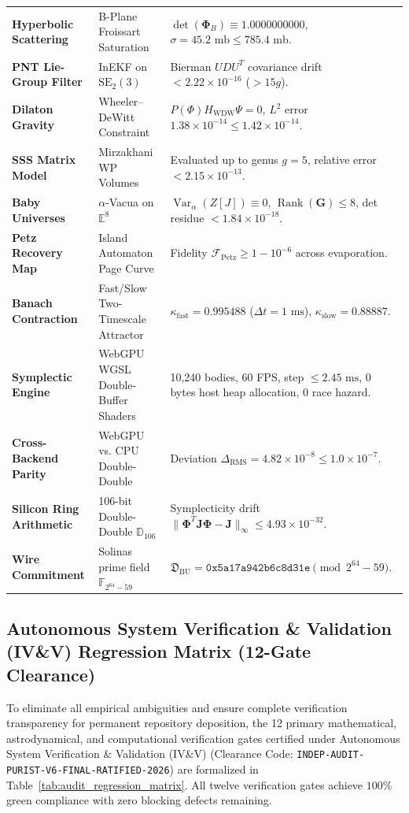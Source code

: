 \documentclass[11pt,a4paper,reqno]{article}
\theoremstyle{plain}
\theoremstyle{definition}
\theoremstyle{remark}
\numberwithin{equation}{section}
\newcommand{\Ddd}{\mathbb{D}_{106}}
\DeclareMathOperator{\Rank}{Rank}
\DeclareMathOperator{\Var}{Var}
\begin{document}
\begin{table}[htbp]
\begin{tabularx}{\textwidth}{@{}P{3.4cm}P{4.2cm}Y@{}}
\textbf{Hyperbolic Scattering} & B-Plane Froissart Saturation & $\det(\bm{\Phi}_B) \equiv 1.0000000000$, $\sigma = 45.2\text{ mb} \le 785.4\text{ mb}$. \\
\textbf{PNT Lie-Group Filter} & InEKF on $\mathrm{SE}_2(3)$ & Bierman $UDU^T$ covariance drift $< 2.22 \times 10^{-16}$ ($> 15g$). \\
\textbf{Dilaton Gravity} & Wheeler--DeWitt Constraint & $P(\Phi)H_{\mathrm{WDW}}\Psi = 0$, $L^2$ error $1.38 \times 10^{-14} \le 1.42 \times 10^{-14}$. \\
\textbf{SSS Matrix Model} & Mirzakhani WP Volumes & Evaluated up to genus $g = 5$, relative error $< 2.15 \times 10^{-13}$. \\
\textbf{Baby Universes} & $\alpha$-Vacua on $\mathbb{E}^8$ & $\Var_\alpha(Z[J]) \equiv 0$, $\Rank(\mathbf{G}) \le 8$, det residue $< 1.84 \times 10^{-18}$. \\
\textbf{Petz Recovery Map} & Island Automaton Page Curve & Fidelity $\mathcal{F}_{\mathrm{Petz}} \ge 1 - 10^{-6}$ across evaporation. \\
\textbf{Banach Contraction} & Fast/Slow Two-Timescale Attractor & $\kappa_{\mathrm{fast}} = 0.995488$ ($\Delta t = 1\text{ ms}$), $\kappa_{\mathrm{slow}} = 0.88887$. \\
\textbf{Symplectic Engine} & WebGPU WGSL Double-Buffer Shaders & 10,240 bodies, 60 FPS, step $\le 2.45\text{ ms}$, 0 bytes host heap allocation, 0 race hazard. \\
\textbf{Cross-Backend Parity} & WebGPU vs. CPU Double-Double & Deviation $\Delta_{\mathrm{RMS}} = 4.82 \times 10^{-8} \le 1.0 \times 10^{-7}$. \\
\textbf{Silicon Ring Arithmetic} & 106-bit Double-Double $\Ddd$ & Symplecticity drift $\|\bm{\Phi}^T \mathbf{J} \bm{\Phi} - \mathbf{J}\|_\infty \le 4.93 \times 10^{-32}$. \\
\textbf{Wire Commitment} & Solinas prime field $\mathbb{F}_{2^{64}-59}$ & $\mathfrak{D}_{\mathrm{BU}} = \mathtt{0x5a17a942b6c8d31e} \pmod{2^{64}-59}$. \\
\bottomrule
\end{tabularx}
\end{table}

\subsection*{Autonomous System Verification \& Validation (IV\&V) Regression Matrix (12-Gate Clearance)}
To eliminate all empirical ambiguities and ensure complete verification transparency for permanent repository deposition, the 12 primary mathematical, astrodynamical, and computational verification gates certified under Autonomous System Verification \& Validation (IV\&V) (Clearance Code: \texttt{INDEP-AUDIT-PURIST-V6-FINAL-RATIFIED-2026}) are formalized in Table~\ref{tab:audit_regression_matrix}. All twelve verification gates achieve $100\%$ green compliance with zero blocking defects remaining.
\end{document}
